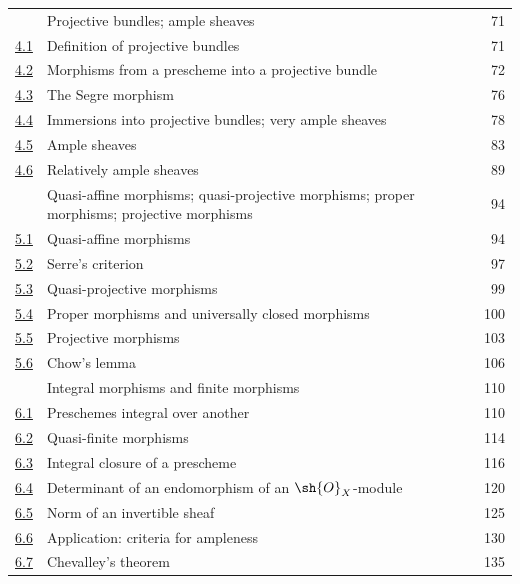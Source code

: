 \begin{longtable}{@{}p{}p{}r@{}}
\hyperref[section:II.4]{\textsection4} & Projective bundles; ample sheaves & 71\\
\hyperref[subsection:II.4.1]{4.1} & Definition of projective bundles & 71\\
\hyperref[subsection:II.4.2]{4.2} & Morphisms from a prescheme into a projective bundle & 72\\
\hyperref[subsection:II.4.3]{4.3} & The Segre morphism & 76\\
\hyperref[subsection:II.4.4]{4.4} & Immersions into projective bundles; very ample sheaves & 78\\
\hyperref[subsection:II.4.5]{4.5} & Ample sheaves & 83\\
\hyperref[subsection:II.4.6]{4.6} & Relatively ample sheaves & 89\\
\hyperref[section:II.5]{\textsection5} & Quasi-affine morphisms; quasi-projective morphisms;
proper morphisms; projective morphisms & 94\\
\hyperref[subsection:II.5.1]{5.1} & Quasi-affine morphisms & 94\\
\hyperref[subsection:II.5.2]{5.2} & Serre's criterion & 97\\
\hyperref[subsection:II.5.3]{5.3} & Quasi-projective morphisms & 99\\
\hyperref[subsection:II.5.4]{5.4} & Proper morphisms and universally closed morphisms & 100\\
\hyperref[subsection:II.5.5]{5.5} & Projective morphisms & 103\\
\hyperref[subsection:II.5.6]{5.6} & Chow's lemma & 106\\
\hyperref[section:II.6]{\textsection6} & Integral morphisms and finite morphisms & 110\\
\hyperref[subsection:II.6.1]{6.1} & Preschemes integral over another & 110\\
\hyperref[subsection:II.6.2]{6.2} & Quasi-finite morphisms & 114\\
\hyperref[subsection:II.6.3]{6.3} & Integral closure of a prescheme & 116\\
\hyperref[subsection:II.6.4]{6.4} & Determinant of an endomorphism of an $\sh{O}_X$-module & 120\\
\hyperref[subsection:II.6.5]{6.5} & Norm of an invertible sheaf & 125\\
\hyperref[subsection:II.6.6]{6.6} & Application: criteria for ampleness & 130\\
\hyperref[subsection:II.6.7]{6.7} & Chevalley's theorem & 135\\

\end{longtable}
